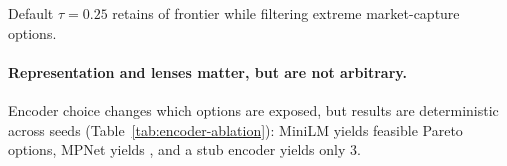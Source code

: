\documentclass[sigconf,review]{acmart}
\begin{document}
\begin{table}[htbp]
\centering
\caption{Effect of dominance threshold $\tau$ on feasible Pareto set size (unified\_v4)}
\label{tab:tau-sweep}
\vspace{1mm}
{\footnotesize Default $\tau{=}0.25$ retains {\TauDefaultCoverage} of frontier while filtering extreme market-capture options.}
\end{table}

\paragraph{Representation and lenses matter, but are not arbitrary.}
Encoder choice changes which options are exposed, but results are deterministic across seeds (Table~\ref{tab:encoder-ablation}): MiniLM yields {\MiniLMParetoSize} feasible Pareto options, MPNet yields {\MPNetParetoSize}, and a stub encoder yields only $3$.

\begin{table}[th]
\centering
\caption{Encoder ablation (unified\_v4, {\NumUniversities} universities). Results deterministic across {\NumSeedsEvaluated} seeds. Cross-encoder Pareto Jaccard = {\CrossEncoderJaccard}, confirming encoder sensitivity.}
\label{tab:encoder-ablation}
\end{table}
\end{document}
